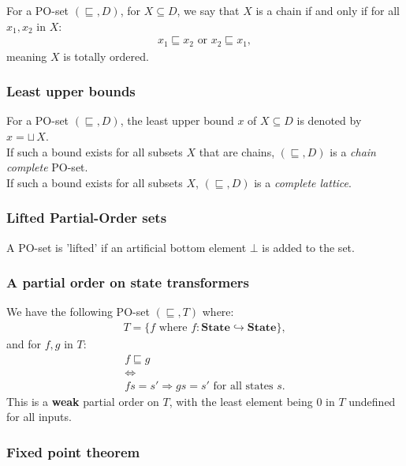 \documentclass[a4paper, 12pt, twoside]{article}
\begin{document}
For a PO-set $(\sqsubseteq, D)$, for $X \subseteq D$, we say that
$X$ is a chain if and only if for all $x_1, x_2$ in $X$: \begin{gather*}
  x_1 \sqsubseteq x_2 \text{ or } x_2 \sqsubseteq x_1,
\end{gather*} meaning $X$ is totally ordered. 

\subsubsection{Least upper bounds}

For a PO-set $(\sqsubseteq, D)$, the least upper bound 
$x$ of $X \subseteq D$ is denoted by $x = \sqcup \, X$. 
\\[\baselineskip]
If such a bound exists for all subsets $X$ that are chains, 
$(\sqsubseteq, D)$ is a \textit{chain complete} PO-set.
\\[\baselineskip]
If such a bound exists for all subsets $X$, $(\sqsubseteq, D)$ 
is a \textit{complete lattice}.

\subsubsection{Lifted Partial-Order sets}

A PO-set is 'lifted' if an artificial bottom element $\bot$
is added to the set.

\subsubsection{A partial order on state transformers}

We have the following PO-set $(\sqsubseteq, T)$ where: \begin{gather*}
  T = \{f \text{ where } f : \textbf{State} \hookrightarrow \textbf{State}\},
\end{gather*} and for $f, g$ in $T$: \begin{gather*}
  f \sqsubseteq g  \\ 
  \Longleftrightarrow \\
  f s = s' \Rightarrow g s = s' \text{ for all states } s. 
\end{gather*} This is a \textbf{weak} partial order on $T$, with
the least element being $0$ in $T$ undefined for all inputs.

\newpage

\subsubsection{Fixed point theorem}
\end{document}
